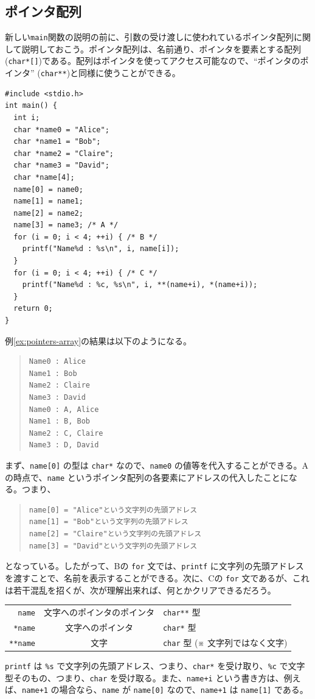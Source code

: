 \subsection{ポインタ配列}

新しい\verb|main|関数の説明の前に、引数の受け渡しに使われているポインタ配列に関して説明しておこう。ポインタ配列は、名前通り、ポインタを要素とする配列(\verb|char*[]|)である。配列はポインタを使ってアクセス可能なので、``ポインタのポインタ'' (\verb|char**|)と同様に使うことができる。
\begin{reidai}\label{ex:pointers-array}
\begin{verbatim}
#include <stdio.h>
int main() {
  int i;
  char *name0 = "Alice";
  char *name1 = "Bob";
  char *name2 = "Claire";
  char *name3 = "David";
  char *name[4];
  name[0] = name0;
  name[1] = name1;
  name[2] = name2;
  name[3] = name3; /* A */
  for (i = 0; i < 4; ++i) { /* B */
    printf("Name%d : %s\n", i, name[i]);
  }
  for (i = 0; i < 4; ++i) { /* C */
    printf("Name%d : %c, %s\n", i, **(name+i), *(name+i));
  }
  return 0;
}
\end{verbatim}
\end{reidai} \noindent
例\ref{ex:pointers-array}の結果は以下のようになる。
\begin{quote}
\begin{verbatim}
Name0 : Alice
Name1 : Bob
Name2 : Claire
Name3 : David
Name0 : A, Alice
Name1 : B, Bob
Name2 : C, Claire
Name3 : D, David
\end{verbatim}
\end{quote}
まず、\verb|name[0]| の型は \verb|char*| なので、\verb|name0| の値等を代入することができる。Aの時点で、\verb|name| というポインタ配列の各要素にアドレスの代入したことになる。つまり、
\begin{quote}
\begin{verbatim}
name[0] = "Alice"という文字列の先頭アドレス
name[1] = "Bob"という文字列の先頭アドレス
name[2] = "Claire"という文字列の先頭アドレス
name[3] = "David"という文字列の先頭アドレス
\end{verbatim}
\end{quote}
となっている。したがって、Bの \verb|for| 文では、\verb|printf| に文字列の先頭アドレスを渡すことで、名前を表示することができる。次に、Cの \verb|for| 文であるが、これは若干混乱を招くが、次が理解出来れば、何とかクリアできるだろう。
\begin{center}
\begin{tabular}{r@{ = }c@{ = }l}
\verb|name|   & 文字へのポインタのポインタ & \verb|char**| 型\\
\verb|*name|  & 文字へのポインタ           & \verb|char*| 型\\
\verb|**name| & 文字                       & \verb|char| 型 (※ 文字列ではなく文字)
\end{tabular}
\end{center}
\verb|printf| は \verb|%s| で文字列の先頭アドレス、つまり、\verb|char*| を受け取り、\verb|%c| で文字型そのもの、つまり、\verb|char| を受け取る。また、\verb|name+i| という書き方は、例えば、\verb|name+1| の場合なら、\verb|name| が \verb|name[0]| なので、\verb|name+1| は \verb|name[1]| である。

